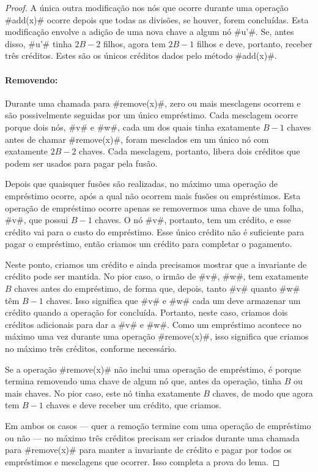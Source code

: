 \begin{proof}
  A única outra modificação nos nós que ocorre durante uma operação #add(x)# ocorre depois que todas as divisões, se houver, forem concluídas. Esta modificação envolve a adição de uma nova chave a algum nó #u'#. Se, antes disso, #u'# tinha $2B-2$ filhos, agora tem $2B-1$ filhos e deve, portanto, receber três créditos. Estes são os únicos créditos dados pelo método #add(x)#.

  \paragraph{Removendo:}
  Durante uma chamada para #remove(x)#, zero ou mais mesclagens ocorrem e são possivelmente seguidas por um único empréstimo. Cada mesclagem ocorre porque dois nós, #v# e #w#, cada um dos quais tinha exatamente $B-1$ chaves antes de chamar #remove(x)#, foram mesclados em um único nó com exatamente $2B-2$ chaves.
  Cada mesclagem, portanto, libera dois créditos que podem ser usados para pagar pela fusão.

  Depois que quaisquer fusões são realizadas, no máximo uma operação de empréstimo ocorre, após a qual não ocorrem mais fusões ou empréstimos. Esta operação de empréstimo ocorre apenas se removermos uma chave de uma folha, #v#, que possui $B-1$ chaves.
  O nó #v#, portanto, tem um crédito, e esse crédito vai para o custo do empréstimo. Esse único crédito não é suficiente para pagar o empréstimo, então criamos um crédito para completar o pagamento.

  Neste ponto, criamos um crédito e ainda precisamos mostrar que a invariante de crédito pode ser mantida. No pior caso, o irmão de #v#, #w#, tem exatamente $B$ chaves antes do empréstimo, de forma que, depois, tanto #v# quanto #w# têm $B-1$ chaves. Isso significa que #v# e #w# cada um deve armazenar um crédito quando a operação for concluída.
  Portanto, neste caso, criamos dois créditos adicionais para dar a #v# e #w#. Como um empréstimo acontece no máximo uma vez durante uma operação #remove(x)#, isso significa que criamos no máximo três créditos, conforme necessário.

  Se a operação #remove(x)# não inclui uma operação de empréstimo, é porque termina removendo uma chave de algum nó que, antes da operação, tinha $B$ ou mais chaves. No pior caso, este nó tinha exatamente $B$ chaves, de modo que agora tem $B-1$ chaves  e deve receber um crédito, que criamos.

  Em ambos os casos --- quer a remoção termine com uma operação de empréstimo ou não --- no máximo três créditos precisam ser criados durante uma chamada para #remove(x)# para manter a invariante de crédito e pagar por todos os empréstimos e mesclagens que ocorrer. Isso completa a prova do lema.
\end{proof}

